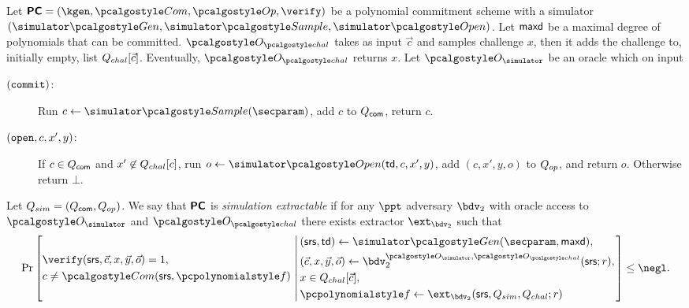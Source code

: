 \documentclass[runningheads,11pt]{llncs}
\let\spvec\vec \let\vec\accentvec
\let\vec\spvec
\begin{document}
\begin{definition}
  \label{def:se_bdv2}
  Let $\PCOM = (\kgen, \com, \op, \verify)$ be a polynomial commitment scheme with a
  simulator $(\simgen, \simsample, \simopen)$. Let $\mathsf{maxd}$ be a maximal degree of
  polynomials that can be committed.  $\oraclec$ takes as input $\vec{c}$ and samples
  challenge $x$, then it adds the challenge to, initially empty, list
  $\Qchal[\vec{c}]$. Eventually, $\oraclec$ returns $x$. Let $\oracles$ be an oracle
  which on input
     \begin{description}
     \item[$(\mathtt{commit})$:] Run $c \gets \simsample (\secparam)$, add $c$ to
       $Q_{\mathsf{com}}$, return $c$.
     \item[$(\mathtt{open}, c, x', y)$:] If $c \in Q_{\mathsf{com}}$ and $x' \not\in {Q_{chal}}[c]$, run
       $o \gets \simopen(\td, c, x', y)$, add $(c, x', y, o)$ to $Q_{op}$, and return
       $o$. Otherwise return $\bot$.
     \end{description}
     Let $Q_{sim} = (Q_{\mathsf{com}}, Q_{op})$.  We say that $\bm{\mathsf{PC}}$ is \emph{simulation
       extractable} if for any $\ppt$ adversary $\bdv_2$ with oracle access to
     $\oracles$ and $\oraclec$ there exists extractor $\ext_{\bdv_2}$ such that
     \[
       \Pr \left[
         \begin{aligned}
           & \verify(\srs, \vec{c}, x, \vec{y}, \vec{o}) = 1, \\
           & c \neq \com(\srs, \p{f})\\
         \end{aligned}
         \,\left|\, \vphantom{
             \begin{aligned}
               & \\
               & \\
               & \\
               &
             \end{aligned}
           }
           \begin{aligned}
             & (\srs, \td) \gets \simgen(\secparam, \maxdeg),\\
             & (\vec{c}, x, \vec{y}, \vec{o}) \gets \bdv_2^{\oracles,\oraclec}(\srs; r), \\
             & x \in \Qchal [\vec{c}], \\
             & \p{f} \gets \ext_{\bdv_2}(\srs, \Qsim, \Qchal; r)
           \end{aligned}
         \right.\right] \leq \negl.
\]
\end{definition}
\end{document}

